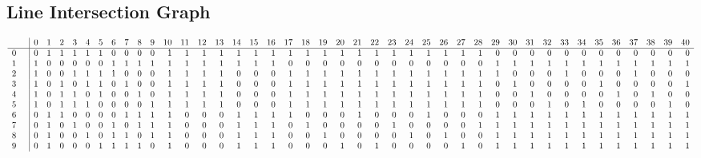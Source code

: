 \documentclass{article}
\begin{document}
{\subsection*{Line Intersection Graph}
{\arraycolsep=1pt
$$
\begin{array}{rr|*{41}r}
 &  & 0 & 1 & 2 & 3 & 4 & 5 & 6 & 7 & 8 & 9 & 10 & 11 & 12 & 13 & 14 & 15 & 16 & 17 & 18 & 19 & 20 & 21 & 22 & 23 & 24 & 25 & 26 & 27 & 28 & 29 & 30 & 31 & 32 & 33 & 34 & 35 & 36 & 37 & 38 & 39 & 40\\
\hline
0 &  & 0 & 1 & 1 & 1 & 1 & 1 & 0 & 0 & 0 & 0 & 1 & 1 & 1 & 1 & 1 & 1 & 1 & 1 & 1 & 1 & 1 & 1 & 1 & 1 & 1 & 1 & 1 & 1 & 1 & 0 & 0 & 0 & 0 & 0 & 0 & 0 & 0 & 0 & 0 & 0 & 0\\
1 &  & 1 & 0 & 0 & 0 & 0 & 0 & 1 & 1 & 1 & 1 & 1 & 1 & 1 & 1 & 1 & 1 & 1 & 0 & 0 & 0 & 0 & 0 & 0 & 0 & 0 & 0 & 0 & 0 & 0 & 1 & 1 & 1 & 1 & 1 & 1 & 1 & 1 & 1 & 1 & 1 & 1\\
2 &  & 1 & 0 & 0 & 1 & 1 & 1 & 1 & 0 & 0 & 0 & 1 & 1 & 1 & 1 & 0 & 0 & 0 & 1 & 1 & 1 & 1 & 1 & 1 & 1 & 1 & 1 & 1 & 1 & 1 & 1 & 0 & 0 & 0 & 1 & 0 & 0 & 0 & 1 & 0 & 0 & 0\\
3 &  & 1 & 0 & 1 & 0 & 1 & 1 & 0 & 1 & 0 & 0 & 1 & 1 & 1 & 1 & 0 & 0 & 0 & 1 & 1 & 1 & 1 & 1 & 1 & 1 & 1 & 1 & 1 & 1 & 1 & 0 & 1 & 0 & 0 & 0 & 0 & 1 & 0 & 0 & 0 & 0 & 1\\
4 &  & 1 & 0 & 1 & 1 & 0 & 1 & 0 & 0 & 1 & 0 & 1 & 1 & 1 & 1 & 0 & 0 & 0 & 1 & 1 & 1 & 1 & 1 & 1 & 1 & 1 & 1 & 1 & 1 & 1 & 0 & 0 & 1 & 0 & 0 & 0 & 0 & 1 & 0 & 1 & 0 & 0\\
5 &  & 1 & 0 & 1 & 1 & 1 & 0 & 0 & 0 & 0 & 1 & 1 & 1 & 1 & 1 & 0 & 0 & 0 & 1 & 1 & 1 & 1 & 1 & 1 & 1 & 1 & 1 & 1 & 1 & 1 & 0 & 0 & 0 & 1 & 0 & 1 & 0 & 0 & 0 & 0 & 1 & 0\\
6 &  & 0 & 1 & 1 & 0 & 0 & 0 & 0 & 1 & 1 & 1 & 1 & 0 & 0 & 0 & 1 & 1 & 1 & 1 & 0 & 0 & 0 & 1 & 0 & 0 & 0 & 1 & 0 & 0 & 0 & 1 & 1 & 1 & 1 & 1 & 1 & 1 & 1 & 1 & 1 & 1 & 1\\
7 &  & 0 & 1 & 0 & 1 & 0 & 0 & 1 & 0 & 1 & 1 & 1 & 0 & 0 & 0 & 1 & 1 & 1 & 0 & 1 & 0 & 0 & 0 & 0 & 1 & 0 & 0 & 0 & 0 & 1 & 1 & 1 & 1 & 1 & 1 & 1 & 1 & 1 & 1 & 1 & 1 & 1\\
8 &  & 0 & 1 & 0 & 0 & 1 & 0 & 1 & 1 & 0 & 1 & 1 & 0 & 0 & 0 & 1 & 1 & 1 & 0 & 0 & 1 & 0 & 0 & 0 & 0 & 1 & 0 & 1 & 0 & 0 & 1 & 1 & 1 & 1 & 1 & 1 & 1 & 1 & 1 & 1 & 1 & 1\\
9 &  & 0 & 1 & 0 & 0 & 0 & 1 & 1 & 1 & 1 & 0 & 1 & 0 & 0 & 0 & 1 & 1 & 1 & 0 & 0 & 0 & 1 & 0 & 1 & 0 & 0 & 0 & 0 & 1 & 0 & 1 & 1 & 1 & 1 & 1 & 1 & 1 & 1 & 1 & 1 & 1 & 1\\

\end{array}$$}}
\end{document}

